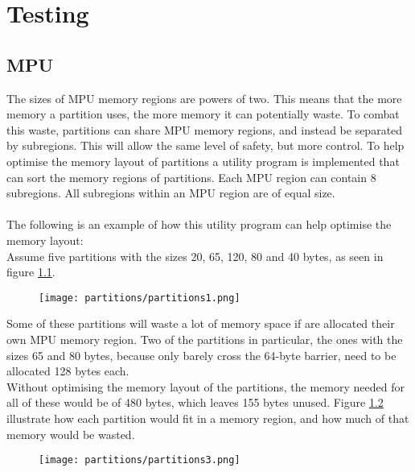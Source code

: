 \chapter{Testing}

\section{MPU}
The sizes of MPU memory regions are powers of two. This means that the more
memory a partition uses, the more memory it can potentially waste. To combat
this waste, partitions can share MPU memory regions, and instead be separated
by subregions. This will allow the same level of safety, but more control.
To help optimise the memory layout of partitions a utility program is implemented
that can sort the memory regions of partitions. Each MPU region can contain 8
subregions. All subregions within an MPU region are of equal size.
\\\\
The following is an example of how this utility program can help optimise the
memory layout:
\\


Assume five partitions with the sizes 20, 65, 120, 80 and 40 bytes, as seen in figure \ref{fig:ce2}.\\

\begin{figure}[H]
\centering
\texttt{[image: partitions/partitions1.png]}
\label{fig:ce2}
\end{figure}

Some of these partitions will waste a lot of memory space if are allocated their
own MPU memory region. Two of the partitions in particular, the ones with the sizes
65 and 80 bytes, because only barely cross the 64-byte barrier, need to be
allocated 128 bytes each.\\
Without optimising the memory layout of the partitions, the memory needed for
all of these would be of 480 bytes, which leaves 155 bytes unused. Figure
\ref{fig:ce3} illustrate how each partition would fit in a memory region, and how
much of that memory would be wasted.\\
\begin{figure}[H]
\centering
\texttt{[image: partitions/partitions3.png]}
\label{fig:ce3}
\end{figure}

